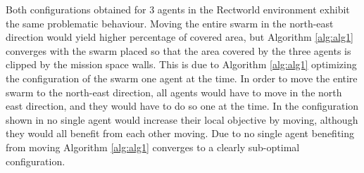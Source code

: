 Both configurations obtained for 3 agents in the Rectworld environment exhibit the same problematic behaviour. Moving the entire swarm in the north-east direction would yield higher percentage of covered area,
but Algorithm \ref{alg:alg1} converges with the swarm placed so that the area covered by the three agents is clipped by the mission space walls. This is due to Algorithm \ref{alg:alg1} optimizing
the configuration of the swarm one agent at the time. In order to move the entire swarm to the north-east direction, all agents would have to move in the north east direction, and they
would have to do so one at the time. In the configuration shown in  no single agent would increase their local objective by moving, although they would all benefit from each other moving.
Due to no single agent benefiting from moving Algorithm \ref{alg:alg1} converges to a clearly sub-optimal configuration.

